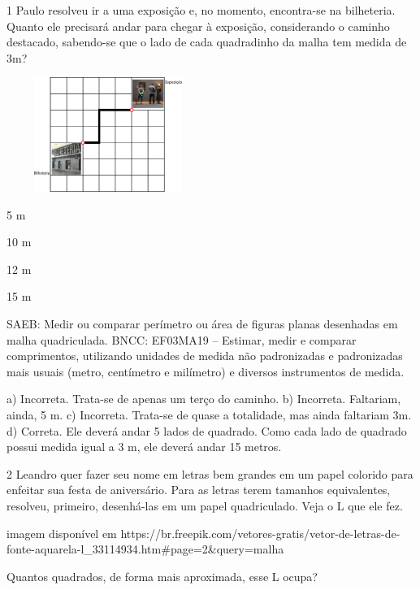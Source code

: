 \begin{escolha}
\num{1} Paulo resolveu ir a uma exposição e, no momento, encontra-se na
bilheteria. Quanto ele precisará andar para chegar à exposição,
considerando o caminho destacado, sabendo-se que o lado de cada
quadradinho da malha tem medida de 3m?


\includegraphics[width=2.60897in,height=1.46587in]{media/image61.png}

\begin{escolha}
\item
  5 m
\item
  10 m
\item
  12 m
\item
  15 m
\end{escolha}

SAEB: Medir ou comparar perímetro ou área de figuras planas desenhadas em malha quadriculada. 
BNCC: EF03MA19 -- Estimar, medir e comparar comprimentos, utilizando unidades de medida
não padronizadas e padronizadas mais usuais (metro, centímetro e milímetro) e diversos
instrumentos de medida.

a) Incorreta. Trata-se de apenas um terço do caminho.
b) Incorreta. Faltariam, ainda, 5 m.
c) Incorreta. Trata-se de quase a totalidade, mas ainda faltariam 3m.
d) Correta. Ele deverá andar 5 lados de quadrado. Como cada lado de quadrado possui
medida igual a 3 m, ele deverá andar 15 metros.

\num{2} Leandro quer fazer seu nome em letras bem grandes em um papel colorido para enfeitar sua festa de aniversário. Para as letras terem tamanhos equivalentes, resolveu, primeiro, desenhá-las em um papel quadriculado. Veja o L que ele fez.

\Inserir imagem disponível em https://br.freepik.com/vetores-gratis/vetor-de-letras-de-fonte-aquarela-l_33114934.htm#page=2&query=malha%

Quantos quadrados, de forma mais aproximada, esse L ocupa?


\end{escolha}
